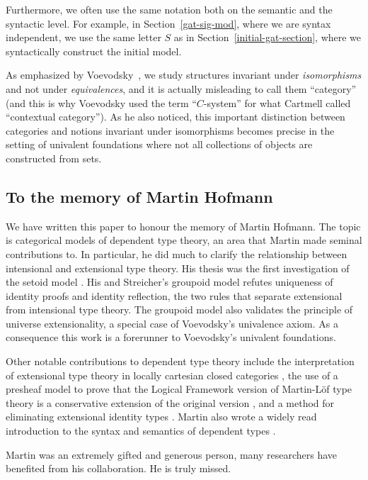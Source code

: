 \documentclass{mscs}
\begin{document}
Furthermore, we often use the same notation both on the semantic and the syntactic level. 
For example, in Section~\ref{gat-sig-mod}, where we are syntax
independent, we use the same letter $S$ as in
Section~\ref{initial-gat-section}, where we syntactically construct the initial model.

As emphasized by Voevodsky~\cite{voevodsky:initiality}, we study structures invariant
under {\em isomorphisms} and not under {\em equivalences}, and it is actually misleading
to call them ``category'' (and this is why Voevodsky used the term ``$C$-system''
for what Cartmell called ``contextual category'').
As he also noticed, this
important distinction between categories and notions invariant under isomorphisms becomes
precise in the setting of univalent foundations where not all collections of objects
are constructed from sets.

\subsection*{To the memory of Martin Hofmann}

We have written this paper to honour the memory of Martin Hofmann. The topic is categorical models of dependent type theory, an area that Martin made seminal contributions to. In particular, he did much to clarify the relationship between intensional and extensional type theory.
His thesis was the first investigation of the setoid model \cite{hofmann:phd}. His and Streicher's groupoid model \cite{hofmann:groupoid} refutes uniqueness of identity proofs and identity reflection, the two rules that separate extensional from intensional type theory. The groupoid model also validates the principle of universe extensionality, a special case of Voevodsky's univalence axiom. As a consequence this work is a forerunner to Voevodsky's univalent foundations.

Other notable contributions to dependent type theory include the interpretation of extensional type theory in locally cartesian closed categories \cite{hofmann:csl,curien-garner-hofmann}, the use of a presheaf model to prove that the Logical Framework version of Martin-Löf type theory is a conservative extension of the original version \cite{hofmann:cambridge}, and a method for eliminating extensional identity types \cite{hofmann:conservativity}. Martin also wrote a widely read introduction to the syntax and semantics of dependent types \cite{hofmann:cambridge}.

Martin was an extremely gifted and generous person,
many researchers have benefited from his collaboration.
He is truly missed.
\end{document}
